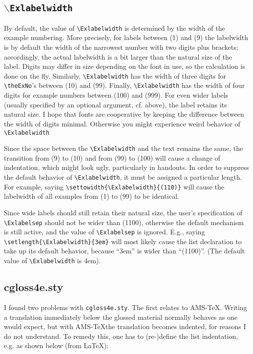 \documentclass{article}
\begin{document}
\subsection*{$\backslash$\tt Exlabelwidth}%
By default, the value of \verb.\Exlabelwidth.  is determined by the 
width of the example numbering.  More precisely, for labels between 
(1) and (9) the labelwidth is by default the width of the narrowest 
number with two digits plus brackets; accordingly, the 
actual labelwidth is a bit larger than the natural size of the 
label.  Digits may differ in size depending on the font in use, so 
the calculation is done on the fly.
Similarly, \verb.\Exlabelwidth.  has the width of three digits for 
\verb-\theExNo-'s between (10) and (99).  Finally, 
\verb,\Exlabelwidth, has the width of four digits for example numbers 
between (100) and (999).  For even wider labels (usually specified by 
an optional argument, cf.  above), the label retains its natural 
size. I hope that fonts are cooperative by keeping the difference 
between the width of digits minimal. Otherwise you might experience 
weird behavior of  \verb.\Exlabelwidth.

Since the space between the \verb.\Exlabelwidth.  and the text 
remains the same, the transition from (9) to (10) and from (99) 
to (100) will cause a change of indentation, which might look 
ugly, particularly  in handouts.  In order to 
suppress the default behavior of \verb|\Exlabelwidth|, it must be 
assigned a particular length.  For example, saying 
\verb.\settowidth{\Exlabelwidth}{(110)}.  will cause the labelwidth of 
all examples from (1) to (99) to be identical.

Since wide labels should still retain their natural size, the user's 
specification of \verb|\Exlabelsep| should not be wider than (1100), 
otherwise the default mechanism is still active, and the value of 
\verb|\Exlabelsep| is ignored.  E.g., saying 
\verb|\setlength{\Exlabelwidth}{3em}| will most likely cause the list 
declaration to take up its default behavior, because ``3em'' is wider 
than ``(1100)''.  (The default value of 
\verb|\Exlabelwidth| is 4em).


\subsection*{cgloss4e.sty}
I found two problems with {\tt cgloss4e.sty}.  The first relates to AMS-\TeX.
Writing a translation immediately below the glossed material normally
behaves as one would expect, but with AMS-\TeX the translation becomes
indented, for reasons I do not understand.  To remedy this, one has to
(re-)define the list indentation, e.g. as shown below (from \LaTeX):
\end{document}
